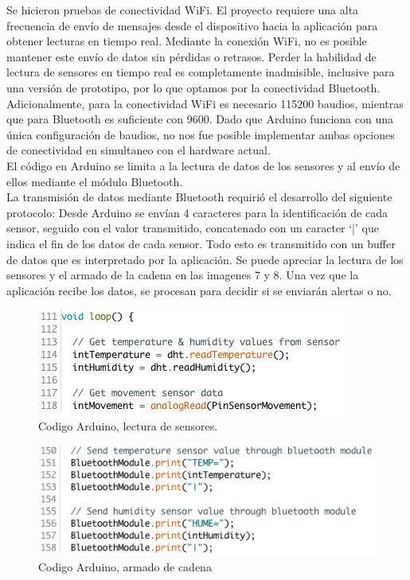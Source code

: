 \documentclass{IEEEtran}
\begin{document}
Se hicieron pruebas de conectividad WiFi. El proyecto requiere una alta frecuencia de envío de mensajes desde el dispositivo hacia la aplicación para obtener lecturas en tiempo real. Mediante la conexión WiFi, no es posible mantener este envío de datos sin pérdidas o retrasos. Perder la habilidad de lectura de sensores en tiempo real es completamente inadmisible, inclusive para una versión de prototipo, por lo que optamos por la conectividad Bluetooth. Adicionalmente, para la conectividad WiFi es necesario 115200 baudios, mientras que para Bluetooth es suficiente con 9600. Dado que Arduino funciona con una única configuración de baudios, no nos fue posible implementar ambas opciones de conectividad en simultaneo con el hardware actual.\\

El código en Arduino se limita a la lectura de datos de los sensores y al envío de ellos mediante el módulo Bluetooth.\\ 
La transmisión de datos mediante Bluetooth requirió el desarrollo del siguiente protocolo: 
Desde Arduino se envían 4 caracteres para la identificación de cada sensor, seguido con el valor transmitido, concatenado con un caracter ‘|’ que indica el fin de los datos de cada sensor. Todo esto es transmitido con un buffer de datos que es interpretado por la aplicación. Se puede apreciar la lectura de los sensores y el armado de la cadena en las imagenes 7 y 8. Una vez que la aplicación recibe los datos, se procesan para decidir si se enviarán alertas o no.

			\begin{figure}[h]
				\centering
				\includegraphics[width=0.8\linewidth]{codigo_arduino_lectura_cortada.png}
				\caption{Codigo Arduino, lectura de sensores.}
				\label{Vista de sensores para el usuario.}
			\end{figure}

			\begin{figure}[h]
				\centering
				\includegraphics[width=0.8\linewidth]{codigo_arduino_protocolo_cortada.png}
				\caption{Codigo Arduino, armado de cadena}
				\label{Parametros para un sensor.}
			\end{figure}
\end{document}
